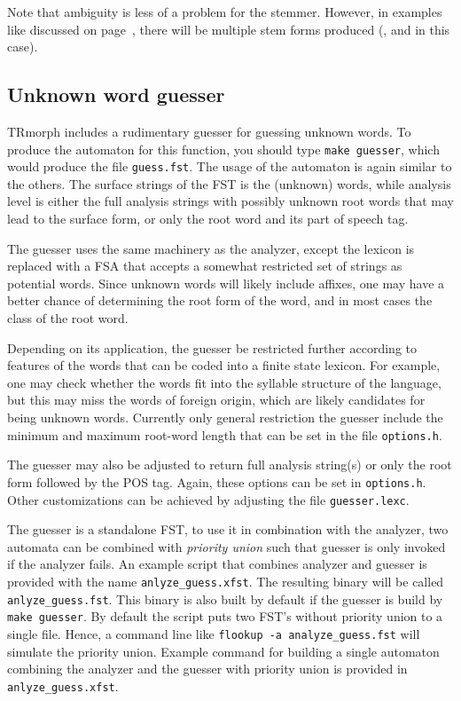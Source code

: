 \documentclass[twocolumn]{article}
\begin{document}
Note that ambiguity is less of a problem for the stemmer. However,
in examples like  discussed on page~\pageref{itm:buna},
there will be multiple stem forms produced (,  and
 in this case).

\subsection{Unknown word guesser}

TRmorph includes a rudimentary guesser for guessing unknown words. To
produce the automaton for this function, you should type
\lstinline{make guesser}, which would produce the file
\lstinline{guess.fst}. The usage of the automaton is again similar to
the others. The surface strings of the FST is the (unknown) words,
while analysis level is either the full analysis strings with possibly
unknown root words that may lead to the surface form, or only the root
word and its part of speech tag.

The guesser uses the same machinery as the analyzer, except the
lexicon is replaced with a FSA that accepts a somewhat restricted set
of strings as potential words. Since unknown words will likely include
affixes, one may have a better chance of determining the root form of
the word, and in most cases the class of the root word.

Depending on its application, the guesser be restricted further
according to features of the words that can be coded into a finite
state lexicon. For example, one may check whether the words fit into
the syllable structure of the language, but this may miss the words of
foreign origin, which are likely candidates for being unknown words.
Currently only general restriction the guesser include the minimum
and maximum root-word length that can be set in the file
\lstinline{options.h}.

The guesser may also be adjusted to
return full analysis string(s) or only the root form followed by the
POS tag. Again, these options can be set in \lstinline{options.h}.
Other customizations can be achieved by adjusting the file
\lstinline{guesser.lexc}.

The guesser is a standalone FST, 
to use it in combination with the analyzer, 
two automata can be combined with \emph{priority union} such that guesser is only invoked if the analyzer fails. 
An example script that combines analyzer and guesser is provided with the name \lstinline{anlyze_guess.xfst}.
The resulting binary will be called \lstinline{anlyze_guess.fst}.
This binary is also built by default if the guesser is build by \lstinline{make guesser}.
By default the script puts two FST's without priority union to a single file.
Hence, a command line like \lstinline{flookup -a analyze_guess.fst} will simulate the priority union.
Example command for building a single automaton combining the analyzer and the guesser with priority union is provided in \lstinline{anlyze_guess.xfst}.
\end{document}

